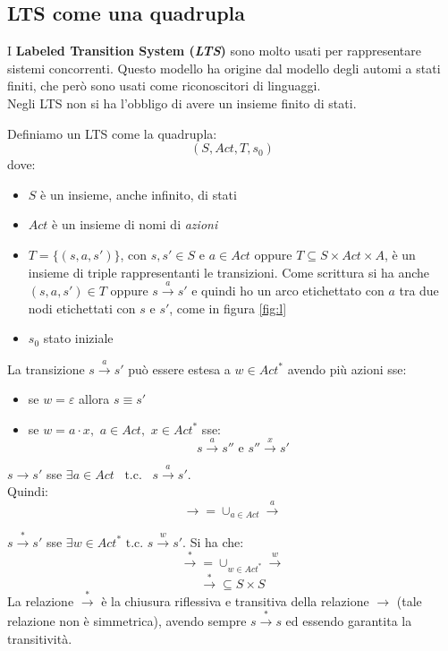 \subsection{LTS come una quadrupla}
I \textbf{Labeled Transition System (\textit{LTS})} sono molto usati per
rappresentare sistemi concorrenti. Questo modello ha origine dal modello degli
automi a stati finiti, che però sono usati come riconoscitori di linguaggi.\\
Negli LTS non si ha l'obbligo di avere un insieme finito di stati.
\begin{definizione}
  Definiamo un LTS come la quadrupla:
  \[(S, Act, T, s_0)\]
  dove:
  \begin{itemize}
    \item $S$ è un insieme, anche infinito, di stati
    \item $Act$ è un insieme di nomi di \textit{azioni}
    \item $T=\{(s, a, s')\}$, con $s, s'\in S$ e $a\in Act$ oppure $T\subseteq
    S\times Act\times A$, è un insieme di triple rappresentanti le
    transizioni. Come scrittura si ha anche $(s, a, s')\in T$ oppure
    $s\stackrel{a}{\rightarrow} s'$ e quindi ho un arco etichettato con $a$ tra
    due nodi etichettati con $s$ e $s'$, come in figura \ref{fig:l}
    \item $s_0$ stato iniziale
  \end{itemize}
\end{definizione}
\begin{definizione} 
  La transizione $s\stackrel{a}{\rightarrow} s'$ può essere estesa a $w\in
  Act^*$ avendo più azioni sse:
  \begin{itemize}
    \item se $w=\varepsilon$ allora $s\equiv s'$
    \item se $w=a\cdot x,\,\, a\in Act,\,\, x\in Act^*$ sse:
    \[s\stackrel{a}{\rightarrow} s'' \mbox{ e } s''\stackrel{x}{\rightarrow}
      s'\]
  \end{itemize}
\end{definizione}
\begin{definizione}
  $s\rightarrow s'$ sse $\exists a \in Act\,\,\,\mbox{ t.c. }\,\,\,
  s\stackrel{a}{\rightarrow} s'$.\\
  Quindi:
  \[\rightarrow =\cup_{a\in Act}\stackrel{a}{\rightarrow}\]
\end{definizione}
\begin{definizione}
  $s\stackrel{*}{\rightarrow} s'$ sse $\exists w\in Act^*\mbox{ t.c. }
  s\stackrel{w}{\rightarrow} s'$. Si ha che:
  \[\stackrel{*}{\rightarrow}=\cup_{w\in Act^*}\stackrel{w}{\rightarrow}\]
  \[\stackrel{*}{\rightarrow}\subseteq S\times S\]
  La relazione $\stackrel{*}{\rightarrow}$ è la chiusura riflessiva e transitiva
  della relazione $\rightarrow$ (tale relazione non è simmetrica), avendo sempre
  $s\stackrel{*}{\rightarrow}s$ ed essendo garantita la transitività.
\end{definizione}
